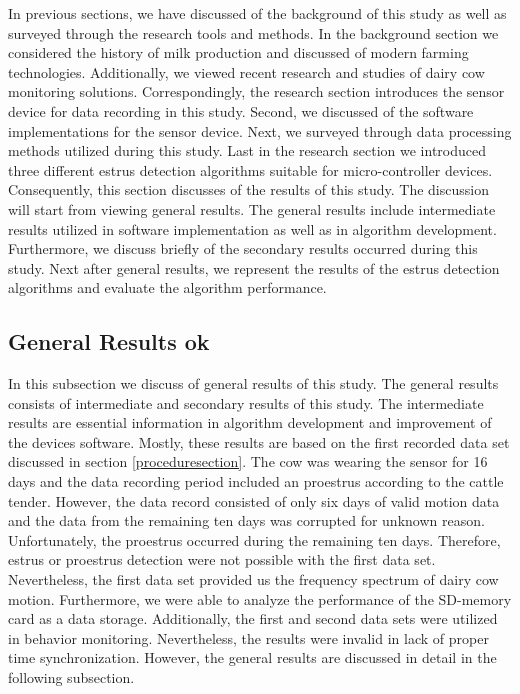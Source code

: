\documentclass[english,12pt,a4paper,pdftex,elec,utf8]{aaltothesis}
\begin{document}
In previous sections, we have discussed of the background of this study as well as surveyed through the research tools and methods. In the background section we considered the history of milk production and discussed of modern farming technologies. Additionally, we viewed recent research and studies of dairy cow monitoring solutions. Correspondingly, the research section introduces the sensor device for data recording in this study. Second, we discussed of the software implementations for the sensor device. Next, we surveyed through data processing methods utilized during this study. Last in the research section we introduced three different estrus detection algorithms suitable for micro-controller devices. Consequently, this section discusses of the results of this study. The discussion will start from viewing general results. The general results include intermediate results utilized in software implementation as well as in algorithm development. Furthermore, we discuss briefly of the secondary results occurred during this study. Next after general results, we represent the results of the estrus detection algorithms and evaluate the algorithm performance. 
 
\subsection{General Results ok} \label{generalresultssection}

In this subsection we discuss of general results of this study. The general results consists of intermediate and secondary results of this study. The intermediate results are essential information in algorithm development and improvement of the devices software. Mostly, these results are based on the first recorded data set discussed in section \ref{proceduresection}. The cow was wearing the sensor for 16 days and the data recording period included an proestrus according to the cattle tender. However, the data record consisted of only six days of valid motion data and the data from the remaining ten days was corrupted for unknown reason. Unfortunately, the proestrus occurred during the remaining ten days. Therefore, estrus or proestrus detection were not possible with the first data set. Nevertheless, the first data set provided us the frequency spectrum of dairy cow motion. Furthermore, we were able to analyze the performance of the SD-memory card as a data storage. Additionally, the first and second data sets were utilized in behavior monitoring. Nevertheless, the results were invalid in lack of proper time synchronization. However, the general results are discussed in detail in the following subsection.
\end{document}

